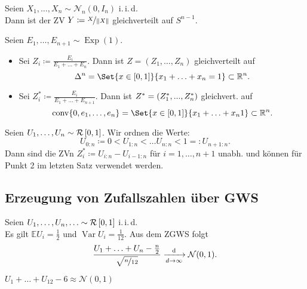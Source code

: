 \documentclass{cheat-sheet}
\newcommand{\E}{\mathbb{E}} %
\newcommand{\iid}{i.\,i.\,d.} %
\newcommand{\Uniform}{\mathcal{R}} %
\DeclareMathOperator{\conv}{conv} %
\DeclareMathOperator{\var}{Var} %
\newcommand{\Normal}{\mathcal{N}} %
\DeclareMathOperator{\Exp}{Exp} %
\begin{document}

\begin{satz}
  Seien $X_1, \ldots, X_n \sim \Normal_n(0, I_n)$ \iid{} \\
  Dann ist der ZV $Y \coloneqq \nicefrac{X}{\lVert X\rVert}$ gleichverteilt auf $S^{n-1}$.
\end{satz}

\begin{satz}
  Seien $E_1, \ldots, E_{n+1} \sim \Exp(1)$.
  \begin{itemize}
    \item Sei $Z_i \coloneqq \tfrac{E_i}{E_1 + \ldots + E_n}$.
    Dann ist $Z = (Z_1, \ldots, Z_n)$ gleichverteilt auf
    \[
      \Delta^n = \Set{x \in \cinterval{0}{1}}{x_1 + \ldots + x_n = 1} \subset \R^n.
    \]
    \item Sei $Z_i^* \coloneqq \tfrac{E_i}{E_1 + \ldots + E_{n+1}}$.
    Dann ist $Z^* = (Z_1^*, ..., Z_n^*)$ gleichvert. auf
    \[
      \conv \{ 0, e_1, \ldots, e_n \} = \Set{x \in \cinterval{0}{1}}{x_1 + \ldots + x_n  1} \subset \R^n.
    \]
  \end{itemize}
\end{satz}

\begin{bem}
  Seien $U_1, \ldots, U_n \sim \Uniform \cinterval{0}{1}$.
  Wir ordnen die Werte:
  \[
    U_{0:n} \coloneqq 0 < U_{1:n} < \ldots U_{n:n} < 1 =: U_{n+1:n}.
  \]
  Dann sind die ZVn $Z_i^* \coloneqq U_{i:n} - U_{i-1 : n}$ für $i = 1, \ldots, n+1$ unabh. und können für Punkt 2 im letzten Satz verwendet werden.
\end{bem}

\subsection{Erzeugung von Zufallszahlen über GWS}

\begin{verf}
  Seien $U_1, \ldots, U_n, \ldots \sim \Uniform \cinterval{0}{1}$ \iid{} \\
  Es gilt $\E U_i = \tfrac{1}{2}$ und $\var U_i = \tfrac{1}{12}$.
  Aus dem ZGWS folgt
  \[
    \frac{U_1 + \ldots + U_n - \tfrac{n}{2}}{\sqrt{\nicefrac{n}{12}}}
    \xra[d \to \infty]{\d} \Normal(0, 1).
  \]
\end{verf}

\begin{bsp}
  $U_1 + \ldots + U_{12} - 6 \approx \Normal(0, 1)$
\end{bsp}
\end{document}
